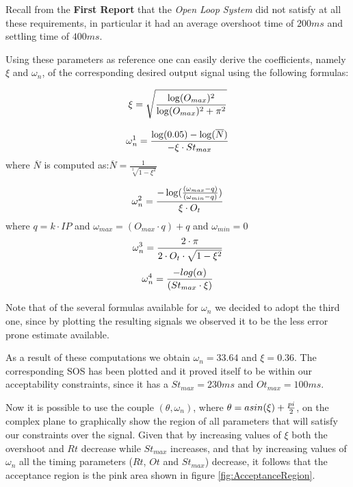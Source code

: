 Recall from the \textbf{First Report} that the \emph{Open Loop System} did not satisfy at all these requirements, in particular it had an average overshoot time of $200 ms$ and settling time of $400 ms$.

Using these parameters as reference one can easily derive the coefficients, namely $\xi$ and $\omega_n$, of the corresponding desired output signal using the following formulas:

	\begin{equation}
  			\xi = {\sqrt{ \log(O_{max})^2 \over \log( O_{max} )^2 + \pi^2 }}
	\end{equation}\label{eq:minCsi}

	\begin{equation}
		\omega{}_{n}^{1} = {{\log(0.05) - \log(\overline{N})} \over {- \xi \cdot St_{max}}}
	\end{equation}
	where \emph{$\overline{N}$} is computed as:$	\overline{N} = \frac{1}{\sqrt[2]{1 - \xi^2}}	$
	
	\begin{equation}
		\omega{}_{n}^{2} = { - \log({(\omega{}_{max} - q) \over (\omega{}_{min} - q) }) \over {\xi \cdot O_t }}
	\end{equation}
	where $ q = k \cdot IP $  and  $\omega{}_{max} = ( O_{max} \cdot q ) + q  $ and $\omega{}_{min} = 0$
	\begin{equation}
		\omega{}_{n}^{3} = {{ 2\cdot{}\pi }\over { 2\cdot{}O_t \cdot \sqrt{1 - \xi^2} } } 
	\end{equation}
	\begin{equation}
		\omega{}_{n}^{4} = { - log(\alpha{}) \over (St_{max} \cdot \xi) } 
	\end{equation}
	
Note that of the several formulas available for $\omega_n$ we decided to adopt the third one, since by plotting the resulting signals we observed it to be the less error prone estimate available.

As a result of these computations we obtain $\omega_n = 33.64$ and $\xi = 0.36$. The corresponding SOS has been plotted and it proved itself to be within our acceptability constraints, since it has a $St_{max} = 230 ms$ and $Ot_{max} = 100 ms$.

Now it is possible to use the couple $(\theta{}, \omega_n)$, where $\theta = asin(\xi) + {pi \over 2}$, on the complex plane to graphically show the region of all parameters that will satisfy our constraints over the signal. Given that by increasing values of $\xi$ both the overshoot and $Rt$ decrease while $St_{max}$ increases, and that by increasing values of $\omega_n$ all the timing parameters ($Rt$, $Ot$ and $St_{max}$) decrease, it follows that the acceptance region is the pink area shown in figure \ref{fig:AcceptanceRegion}. 

